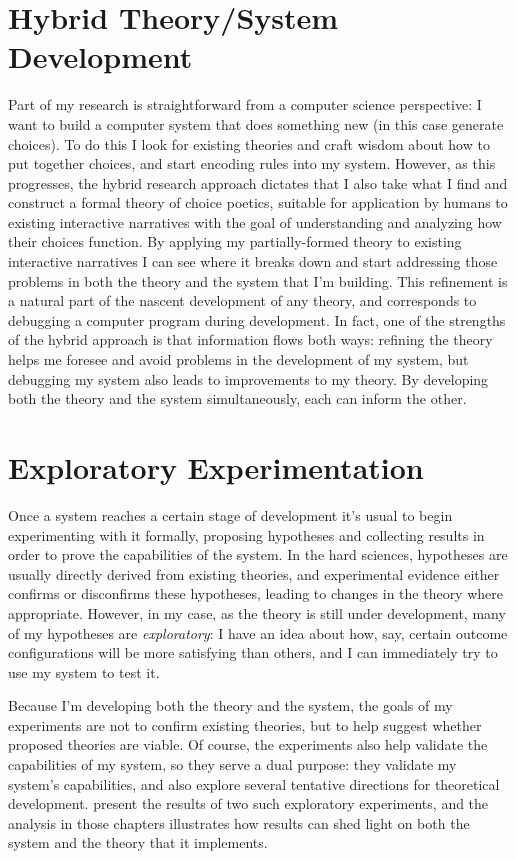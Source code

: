 \section{Hybrid Theory/System Development}

Part of my research is straightforward from a computer science perspective: I want to build a computer system that does something new (in this case generate choices).
%
To do this I look for existing theories and craft wisdom about how to put together choices, and start encoding rules into my system.
%
However, as this progresses, the hybrid research approach dictates that I also take what I find and construct a formal theory of choice poetics, suitable for application by humans to existing interactive narratives with the goal of understanding and analyzing how their choices function.
%
By applying my partially-formed theory to existing interactive narratives I can see where it breaks down and start addressing those problems in both the theory and the system that I'm building.
%
This refinement is a natural part of the nascent development of any theory, and corresponds to debugging a computer program during development.
%
In fact, one of the strengths of the hybrid approach is that information flows both ways: refining the theory helps me foresee and avoid problems in the development of my system, but debugging my system also leads to improvements to my theory.
%
By developing both the theory and the system simultaneously, each can inform the other.


\section{Exploratory Experimentation}

Once a system reaches a certain stage of development it's usual to begin experimenting with it formally, proposing hypotheses and collecting results in order to prove the capabilities of the system.
%
In the hard sciences, hypotheses are usually directly derived from existing theories, and experimental evidence either confirms or disconfirms these hypotheses, leading to changes in the theory where appropriate.
%
However, in my case, as the theory is still under development, many of my hypotheses are \emph{exploratory}: I have an idea about how, say, certain outcome configurations will be more satisfying than others, and I can immediately try to use my system to test it.


Because I'm developing both the theory and the system, the goals of my experiments are not to confirm existing theories, but to help suggest whether proposed theories are viable.
%
Of course, the experiments also help validate the capabilities of my system, so they serve a dual purpose: they validate my system's capabilities, and also explore several tentative directions for theoretical development.
%
 present the results of two such exploratory experiments, and the analysis in those chapters illustrates how results can shed light on both the system and the theory that it implements.


